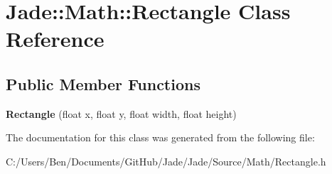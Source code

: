 \hypertarget{class_jade_1_1_math_1_1_rectangle}{}\section{Jade\+:\+:Math\+:\+:Rectangle Class Reference}
\label{class_jade_1_1_math_1_1_rectangle}
\subsection*{Public Member Functions}
\begin{DoxyCompactItemize}
\item 
\hypertarget{class_jade_1_1_math_1_1_rectangle_a81b43b9a6c1700fdb71fb42f6a18ae18}{}{\bfseries Rectangle} (float x, float y, float width, float height)\label{class_jade_1_1_math_1_1_rectangle_a81b43b9a6c1700fdb71fb42f6a18ae18}

\end{DoxyCompactItemize}


The documentation for this class was generated from the following file\+:\begin{DoxyCompactItemize}
\item 
C\+:/\+Users/\+Ben/\+Documents/\+Git\+Hub/\+Jade/\+Jade/\+Source/\+Math/Rectangle.\+h\end{DoxyCompactItemize}
